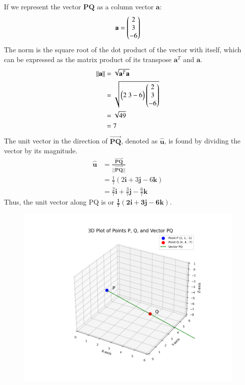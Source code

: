 \documentclass[journal]{IEEEtran}
\begin{document}
If we represent the vector \(\mathbf{PQ}\) as a column vector \(\mathbf{a}\):
\[
\mathbf{a} = 
\begin{pmatrix}2\\3\\-6\end{pmatrix}
\]
The norm is the square root of the dot product of the vector with itself, which can be expressed as the matrix product of its transpose \(\mathbf{a}^T\) and \(\mathbf{a}\).
\begin{align}
    \left\| \mathbf{a} \right\| &= \sqrt{\mathbf{a}^T \mathbf{a}} \\
    &= \sqrt{
        \begin{pmatrix}2\ 3-6\end{pmatrix}
        \begin{pmatrix}2\\3\\-6\end{pmatrix}
    } \\
    &= \sqrt{49} \\
    &= 7
\end{align}
The unit vector in the direction of $\vec{\mathbf{PQ}}$, denoted as $\mathbf{\hat{u}}$, is found by dividing the vector by its magnitude.
\begin{align}
    \mathbf{\hat{u}} &= \frac{\vec{\mathbf{PQ}}}{||\vec{\mathbf{PQ}}||} \\
    &= \frac{1}{7}(2\mathbf{i} + 3\mathbf{j} - 6\mathbf{k}) \\
    &= \frac{2}{7}\mathbf{i} + \frac{3}{7}\mathbf{j} - \frac{6}{7}\mathbf{k}
\end{align}
Thus, the unit vector along PQ is  or $\mathbf{\frac{1}{7}(2\mathbf{i} + 3\mathbf{j} - 6\mathbf{k})}$.
\begin{figure}[H]
\begin{center}
\includegraphics[width=0.7\columnwidth]{figs/fig1.png}
\end{center}
\caption{}
\label{fig:Fig.1}
\end{figure}
\end{document}
